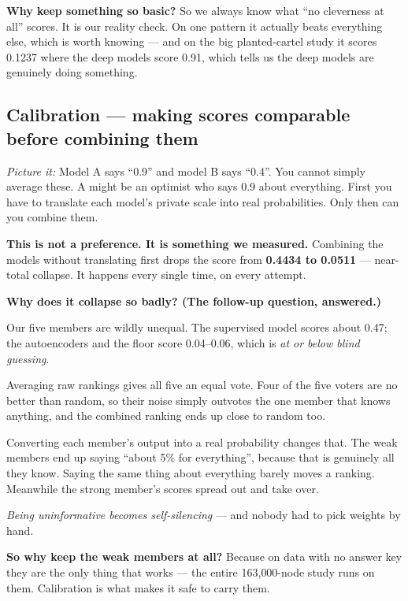 \documentclass[11pt,a4paper]{article}
\newcommand{\pw}[1]{\textit{\textcolor{accent}{Picture it:}} #1}
\begin{document}
\textbf{Why keep something so basic?} So we always know what ``no cleverness at
all'' scores. It is our reality check. On one pattern it actually beats
everything else, which is worth knowing --- and on the big planted-cartel study it
scores 0.1237 where the deep models score 0.91, which tells us the deep models
are genuinely doing something.

\subsection{Calibration --- making scores comparable before combining them}

\begin{plain}
\pw{Model A says ``0.9'' and model B says ``0.4''. You cannot simply average
these. A might be an optimist who says 0.9 about everything. First you have to
translate each model's private scale into real probabilities. Only then can you
combine them.}
\end{plain}

\textbf{This is not a preference. It is something we measured.} Combining the
models without translating first drops the score from \textbf{0.4434 to 0.0511}
--- near-total collapse. It happens every single time, on every attempt.

\begin{keybox}
\textbf{Why does it collapse so badly? (The follow-up question, answered.)}

Our five members are wildly unequal. The supervised model scores about 0.47; the
autoencoders and the floor score 0.04--0.06, which is \emph{at or below blind
guessing}.

Averaging raw rankings gives all five an equal vote. Four of the five voters are
no better than random, so their noise simply outvotes the one member that knows
anything, and the combined ranking ends up close to random too.

Converting each member's output into a real probability changes that. The weak
members end up saying ``about 5\% for everything'', because that is genuinely
all they know. Saying the same thing about everything barely moves a ranking.
Meanwhile the strong member's scores spread out and take over.

\emph{Being uninformative becomes self-silencing} --- and nobody had to pick
weights by hand.

\textbf{So why keep the weak members at all?} Because on data with no answer key
they are the only thing that works --- the entire 163{,}000-node study runs on
them. Calibration is what makes it safe to carry them.
\end{keybox}
\end{document}
